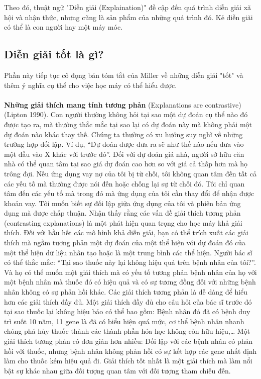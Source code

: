 Theo đó, thuật ngữ "Diễn giải (Explaination)" đề cập đến quá trình diễn giải xã hội và nhận thức, nhưng cũng là sản phẩm của những quá trình đó. Kẻ diễn giãi có thể là con người hay một máy móc.

\subsection{Diễn giải tốt là gì?}
Phần này tiếp tục cô đọng bản tóm tắt của Miller về những diễn giải "tốt" và thêm ý nghĩa cụ thể cho việc học máy có thể hiểu được.
\\\\
\textbf{Những giải thích mang tính tương phản} (Explanations are contrastive) (Lipton 1990). Con người thường không hỏi tại sao một dự đoán cụ thể nào đó được tạo ra, mà thường thắc mắc tại sao lại có dự đoán này mà không phải một dự đoán nào khác thay thế. Chúng ta thường có xu hướng suy nghĩ về những trường hợp đối lập. Ví dụ, “Dự đoán được đưa ra sẽ như thế nào nếu đưa vào một đầu vào X khác với trước đó”. Đối với dự đoán giá nhà, người sở hữu căn nhà có thể quan tâm tại sao giá dự đoán cao hơn so với giá cả thấp hơn mà họ trông đợi. Nếu ứng dụng vay nợ của tôi bị từ chối, tôi không quan tâm đến tất cả các yếu tố mà thường được nói đến hoặc chống lại sự từ chối đó. Tôi chỉ quan tâm đến các yếu tố mà trong đó mà ứng dụng của tôi cần thay đổi để nhận được khoản vay. Tôi muốn biết sự đối lập giữa ứng dụng của tôi và phiên bản ứng dụng mà được chấp thuận. Nhận thấy rằng các vấn đề giải thích tương phản (contrasting explanations) là một phát hiện quan trọng cho học máy khả giải thích. Đối với hầu hết các mô hình khả diễn giải, bạn có thể trích xuất các giải thích mà ngầm tương phản một dự đoán của một thể hiện với dự đoán đó của một thể hiện dữ liệu nhân tạo hoặc là một trung bình các thể hiện. Người bác sĩ có thể thắc mắc: “Tại sao thuốc này lại không hiệu quả trên bệnh nhân của tôi?”. Và họ có thể muốn một giải thích mà có yếu tố tương phản bệnh nhân của họ với một bệnh nhân mà thuốc đó có hiệu quả và có sự tương đồng đối với những bệnh nhân không có sự phản hồi khác. Các giải thích tương phản là dễ dàng để hiểu hơn các giải thích đầy đủ. Một giải thích đầy đủ cho câu hỏi của bác sĩ trước đó tại sao thuốc lại không hiệu bảo có thể bao gồm: Bệnh nhân đó đã có bệnh duy trì suốt 10 năm, 11 gene là đã có biểu hiện quá mức, cơ thể bệnh nhân nhanh chóng phá hủy thuốc thành các thành phần hóa học không còn hữu hiệu,… Một giải thích tương phản có đơn giản hơn nhiều: Đối lập với các bệnh nhân có phản hồi với thuốc, nhưng bệnh nhân không phản hồi có sự kết hợp các gene nhất định làm cho thuốc kém hiệu quả đi. Giải thích tốt nhất là một giải thích mà làm nổi bật sự khác nhau giữa đối tượng quan tâm với đối tượng tham chiếu đến.

